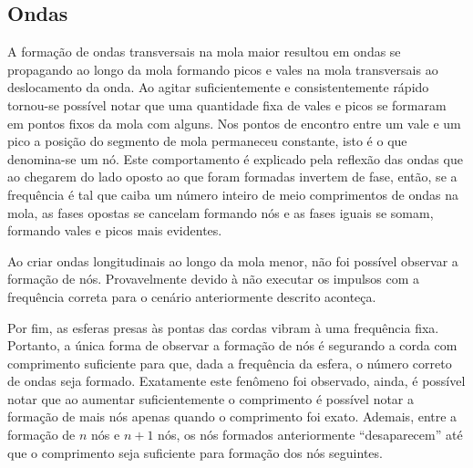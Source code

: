           
\subsection{Ondas}
A formação de ondas transversais na mola maior resultou em ondas se propagando ao longo da mola formando picos e vales na mola transversais ao deslocamento da onda. Ao agitar suficientemente e consistentemente rápido tornou-se possível notar que uma quantidade fixa de vales e picos se formaram em pontos fixos da mola com alguns. Nos pontos de encontro entre um vale e um pico a posição do segmento de mola permaneceu constante, isto é o que denomina-se um nó. Este comportamento é explicado pela reflexão das ondas que ao chegarem do lado oposto ao que foram formadas invertem de fase, então, se a frequência é tal que caiba um número inteiro de meio comprimentos de ondas na mola, as fases opostas se cancelam formando nós e as fases iguais se somam, formando vales e picos mais evidentes. 

Ao criar ondas longitudinais ao longo da mola menor, não foi possível observar a formação de nós. Provavelmente devido à não executar os impulsos com a frequência correta para o cenário anteriormente descrito aconteça. 
    
Por fim, as esferas presas às pontas das cordas vibram à uma frequência fixa. Portanto, a única forma de observar a formação de nós é segurando a corda com comprimento suficiente para que, dada a frequência da esfera, o número correto de ondas seja formado. Exatamente este fenômeno foi observado, ainda, é possível notar que ao aumentar suficientemente o comprimento é possível notar a formação de mais nós apenas quando o comprimento foi exato. Ademais, entre a formação de \(n\) nós e \(n+1\) nós, os nós formados anteriormente ``desaparecem'' até que o comprimento seja suficiente para formação dos nós seguintes.
